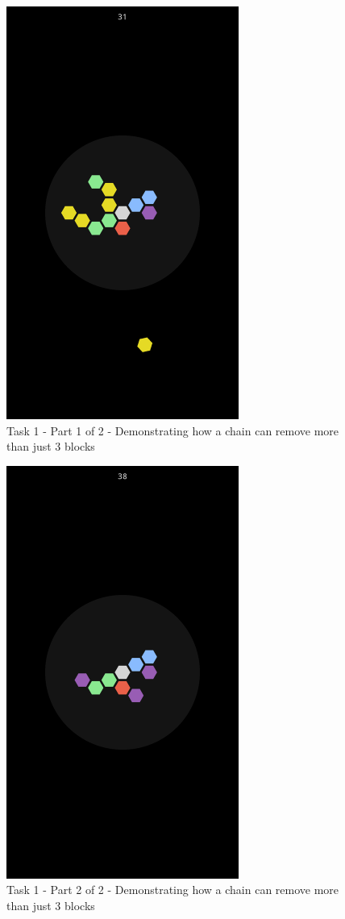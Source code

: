 \documentclass{article}
\begin{document}
	\begin{figure}[ht]
		\includegraphics[width=3in]{img/t1s3.png}
		\centering
		\caption{Task 1 - Part 1 of 2 - Demonstrating how a chain can remove more than just 3 blocks}
	\end{figure}
	\begin{figure}[ht]
		\includegraphics[width=3in]{img/t1s4.png}
		\centering
		\caption{Task 1 - Part 2 of 2 - Demonstrating how a chain can remove more than just 3 blocks}
	\end{figure}
\end{document}
